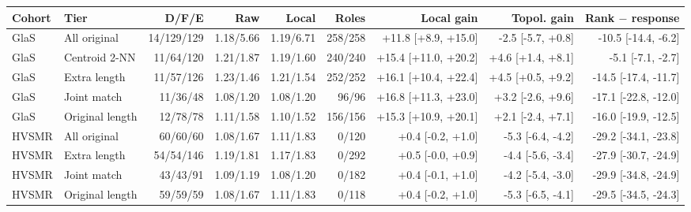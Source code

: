 \begin{tabular}{@{}llrrrrrrr@{}}
\toprule
Cohort & Tier & D/F/E & Raw & Local & Roles & Local gain & Topol. gain & Rank $-$ response \\
\midrule
GlaS & All original & 14/129/129 & 1.18/5.66 & 1.19/6.71 & 258/258 & +11.8 [+8.9, +15.0] & -2.5 [-5.7, +0.8] & -10.5 [-14.4, -6.2] \\
GlaS & Centroid 2-NN & 11/64/120 & 1.21/1.87 & 1.19/1.60 & 240/240 & +15.4 [+11.0, +20.2] & +4.6 [+1.4, +8.1] & -5.1 [-7.1, -2.7] \\
GlaS & Extra length & 11/57/126 & 1.23/1.46 & 1.21/1.54 & 252/252 & +16.1 [+10.4, +22.4] & +4.5 [+0.5, +9.2] & -14.5 [-17.4, -11.7] \\
GlaS & Joint match & 11/36/48 & 1.08/1.20 & 1.08/1.20 & 96/96 & +16.8 [+11.3, +23.0] & +3.2 [-2.6, +9.6] & -17.1 [-22.8, -12.0] \\
GlaS & Original length & 12/78/78 & 1.11/1.58 & 1.10/1.52 & 156/156 & +15.3 [+10.9, +20.1] & +2.1 [-2.4, +7.1] & -16.0 [-19.9, -12.5] \\
\midrule
HVSMR & All original & 60/60/60 & 1.08/1.67 & 1.11/1.83 & 0/120 & +0.4 [-0.2, +1.0] & -5.3 [-6.4, -4.2] & -29.2 [-34.1, -23.8] \\
HVSMR & Extra length & 54/54/146 & 1.19/1.81 & 1.17/1.83 & 0/292 & +0.5 [-0.0, +0.9] & -4.4 [-5.6, -3.4] & -27.9 [-30.7, -24.9] \\
HVSMR & Joint match & 43/43/91 & 1.09/1.19 & 1.08/1.20 & 0/182 & +0.4 [-0.1, +1.0] & -4.2 [-5.4, -3.0] & -29.9 [-34.8, -24.9] \\
HVSMR & Original length & 59/59/59 & 1.08/1.67 & 1.11/1.83 & 0/118 & +0.4 [-0.2, +1.0] & -5.3 [-6.5, -4.1] & -29.5 [-34.5, -24.3] \\
\bottomrule
\end{tabular}
